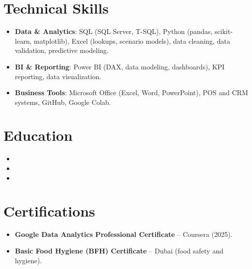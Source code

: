 \documentclass[11pt,a4paper,sans]{moderncv}
\begin{document}

\section{Technical Skills}
\vspace{1pt}
\begin{itemize}
\item \textbf{Data \& Analytics}: SQL (SQL Server, T-SQL), Python (pandas, scikit-learn, matplotlib), Excel (lookups, scenario models), data cleaning, data validation, predictive modeling.
\item \textbf{BI \& Reporting}: Power BI (DAX, data modeling, dashboards), KPI reporting, data visualization.
\item \textbf{Business Tools}: Microsoft Office (Excel, Word, PowerPoint), POS and CRM systems, GitHub, Google Colab.
\end{itemize}


\section{Education}
\vspace{1pt}
\begin{itemize}

\item{}

\item{}

\item{}

\end{itemize}


\section{Certifications}
\vspace{1pt}
\begin{itemize}
\item{\textbf{Google Data Analytics Professional Certificate} -- Coursera (2025).}
\item{\textbf{Basic Food Hygiene (BFH) Certificate} -- Dubai (food safety and hygiene).}
\end{itemize}
\end{document}
